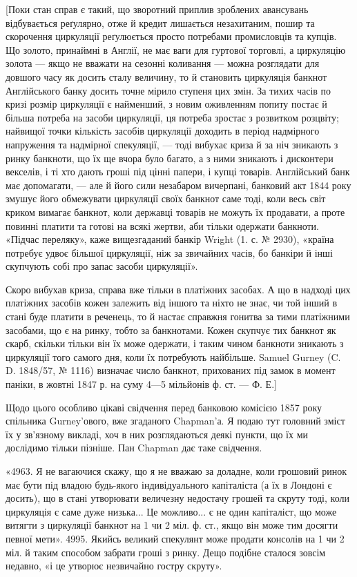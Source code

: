 [Поки стан справ є такий, що зворотний приплив зроблених авансувань
відбувається реґулярно, отже й кредит лишається незахитаним, пошир та
скорочення циркуляції реґулюється просто потребами промисловців та купців. Що
золото, принаймні в Англії, не має ваги для гуртової торговлі, а циркуляцію
золота — якщо не вважати на сезонні коливання — можна розглядати для довшого
часу як досить сталу величину, то й становить циркуляція банкнот Англійського
банку досить точне мірило ступеня цих змін. За тихих часів по кризі розмір
циркуляції є найменший, з новим оживленням попиту постає й більша потреба
на засоби циркуляції, ця потреба зростає з розвитком розцвіту; найвищої точки
кількість засобів циркуляції доходить в період надмірного напруження та надмірної
спекуляції, — тоді вибухає криза й за ніч зникають з ринку банкноти,
що їх ще вчора було багато, а з ними зникають і дисконтери векселів, і ті хто
дають гроші під цінні папери, і купці товарів. Англійський банк має допомагати,
— але й його сили незабаром вичерпані, банковий акт 1844 року змушує
його обмежувати циркуляції своїх банкнот саме тоді, коли весь світ криком
вимагає банкнот, коли державці товарів не можуть їх продавати, а проте повинні
платити та готові на всякі жертви, аби тільки одержати банкноти. «Підчас
переляку», каже вищезгаданий банкір Wright (1. с. № 2930), «країна потребує
удвоє більшої циркуляції, ніж за звичайних часів, бо банкіри й інші скупчують
собі про запас засоби циркуляції».

Скоро вибухав криза, справа вже тільки в платіжних засобах. А що
в надході цих платіжних засобів кожен залежить від іншого та ніхто не знає,
чи той інший в стані буде платити в реченець, то й настає справжня гонитва
за тими платіжними засобами, що є на ринку, тобто за банкнотами. Кожен
скупчує тих банкнот як скарб, скільки тільки він їх може одержати, і таким
чином банкноти зникають з циркуляції того самого дня, коли їх потребують
найбільше. Samuel Gurney (C. D. 1848/57, № 1116) визначає число банкнот,
прихованих під замок в момент паніки, в жовтні 1847 р. на суму 4—5 мільйонів
ф. ст. — Ф. Е.]

Щодо цього особливо цікаві свідчення перед банковою комісією 1857 року
спільника Gurney’ового, вже згаданого Chapman’а. Я подаю тут головний
зміст їх у зв’язному викладі, хоч в них розглядаються деякі пункти, що їх ми
дослідимо тільки пізніше. Пан Chapman дає таке свідчення.

«4963. Я не вагаючися скажу, що я не вважаю за доладне, коли грошовий
ринок має бути під владою будь-якого індивідуального капіталіста (а їх
в Лондоні є досить), що в стані утворювати величезну недостачу грошей та скруту
тоді, коли циркуляція є саме дуже низька... Це можливо... є не один капіталіст,
що може витягти з циркуляції банкнот на 1 чи 2 міл. ф. ст., якщо він
може тим досягти певної мети». 4995. Якийсь великий спекулянт може продати
консолів на 1 чи 2 міл. й таким способом забрати гроші з ринку. Дещо подібне
сталося зовсім недавно, «і це утворює незвичайно гостру скруту».

